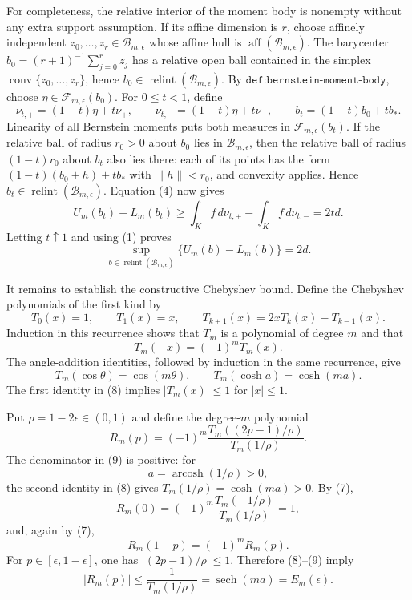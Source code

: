 For completeness, the relative interior of the moment body is nonempty without any extra support assumption.  If its affine dimension is \(r\), choose affinely independent \(z_0,\ldots,z_r\in\mathcal B_{m,\epsilon}\) whose affine hull is \(\operatorname{aff}(\mathcal B_{m,\epsilon})\).  The barycenter \(b_0=(r+1)^{-1}\sum_{j=0}^rz_j\) has a relative open ball contained in the simplex \(\operatorname{conv}\{z_0,\ldots,z_r\}\), hence \(b_0\in\operatorname{relint}(\mathcal B_{m,\epsilon})\).  By \(\texttt{def:bernstein-moment-body}\), choose \(\eta\in\mathcal F_{m,\epsilon}(b_0)\).  For \(0\leq t<1\), define
\[
 \nu_{t,+}=(1-t)\eta+t\nu_+,
 \qquad
 \nu_{t,-}=(1-t)\eta+t\nu_-,
 \qquad
 b_t=(1-t)b_0+tb_*.
\]
Linearity of all Bernstein moments puts both measures in \(\mathcal F_{m,\epsilon}(b_t)\).  If the relative ball of radius \(r_0>0\) about \(b_0\) lies in \(\mathcal B_{m,\epsilon}\), then the relative ball of radius \((1-t)r_0\) about \(b_t\) also lies there: each of its points has the form \((1-t)(b_0+h)+tb_*\) with \(\lVert h\rVert<r_0\), and convexity applies.  Hence \(b_t\in\operatorname{relint}(\mathcal B_{m,\epsilon})\).  Equation (4) now gives
\[
 U_m(b_t)-L_m(b_t)
 \geq\int_Kf\,d\nu_{t,+}-\int_Kf\,d\nu_{t,-}
 =2td.
\]
Letting \(t\uparrow1\) and using (1) proves
\[
 \sup_{b\in\operatorname{relint}(\mathcal B_{m,\epsilon})}
 \{U_m(b)-L_m(b)\}=2d. \tag{6}
\]

It remains to establish the constructive Chebyshev bound.  Define the Chebyshev polynomials of the first kind by
\[
 T_0(x)=1,\qquad T_1(x)=x,
 \qquad T_{k+1}(x)=2xT_k(x)-T_{k-1}(x).
\]
Induction in this recurrence shows that \(T_m\) is a polynomial of degree \(m\) and that
\[
 T_m(-x)=(-1)^mT_m(x). \tag{7}
\]
The angle-addition identities, followed by induction in the same recurrence, give
\[
 T_m(\cos\theta)=\cos(m\theta),
 \qquad
 T_m(\cosh a)=\cosh(ma). \tag{8}
\]
The first identity in (8) implies \(|T_m(x)|\leq1\) for \(|x|\leq1\).

Put \(\rho=1-2\epsilon\in(0,1)\) and define the degree-\(m\) polynomial
\[
 R_m(p)=(-1)^m
 \frac{T_m((2p-1)/\rho)}{T_m(1/\rho)}. \tag{9}
\]
The denominator in (9) is positive: for
\[
 a=\operatorname{arcosh}(1/\rho)>0,
\]
the second identity in (8) gives \(T_m(1/\rho)=\cosh(ma)>0\).  By (7),
\[
 R_m(0)=(-1)^m\frac{T_m(-1/\rho)}{T_m(1/\rho)}=1, \tag{10}
\]
and, again by (7),
\[
 R_m(1-p)=(-1)^mR_m(p). \tag{11}
\]
For \(p\in[\epsilon,1-\epsilon]\), one has \(|(2p-1)/\rho|\leq1\).  Therefore (8)--(9) imply
\[
 |R_m(p)|\leq \frac{1}{T_m(1/\rho)}
 =\operatorname{sech}(ma)=E_m(\epsilon). \tag{12}
\]


